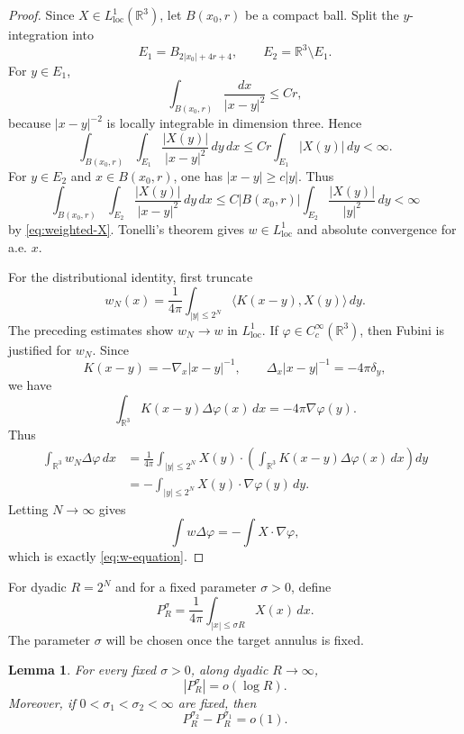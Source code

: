 \documentclass[11pt]{amsart}
\numberwithin{equation}{section}
\newtheorem{lemma}[theorem]{Lemma}
\theoremstyle{definition}
\newcommand{\R}{\mathbb R}
\newcommand{\loc}{\mathrm{loc}}
\newcommand{\ip}[2]{\langle #1,#2\rangle}
\newcommand{\abs}[1]{\left\lvert #1\right\rvert}
\begin{document}
\begin{proof}
Since $X\in L^1_{\loc}(\R^3)$, let $B(x_0,r)$ be a compact ball.  Split the $y$-integration into
$$
        E_1=B_{2\abs{x_0}+4r+4},
        \qquad E_2=\R^3\setminus E_1.
$$
For $y\in E_1$,
$$
        \int_{B(x_0,r)}\frac{dx}{\abs{x-y}^2}\le Cr,
$$
because $\abs{x-y}^{-2}$ is locally integrable in dimension three.  Hence
$$
        \int_{B(x_0,r)}\int_{E_1}\frac{\abs{X(y)}}{\abs{x-y}^2}\,dy\,dx
        \le Cr\int_{E_1}\abs{X(y)}\,dy<\infty.
$$
For $y\in E_2$ and $x\in B(x_0,r)$, one has $\abs{x-y}\ge c\abs y$.  Thus
$$
        \int_{B(x_0,r)}\int_{E_2}\frac{\abs{X(y)}}{\abs{x-y}^2}\,dy\,dx
        \le C\abs{B(x_0,r)}\int_{E_2}\frac{\abs{X(y)}}{\abs y^2}\,dy<\infty
$$
by \eqref{eq:weighted-X}.  Tonelli's theorem gives $w\in L^1_{\loc}$ and absolute convergence for a.e. $x$.

For the distributional identity, first truncate
$$
        w_N(x)=\frac1{4\pi}\int_{\abs y\le 2^N}\ip{K(x-y)}{X(y)}\,dy.
$$
The preceding estimates show $w_N\to w$ in $L^1_{\loc}$.  If $\varphi\in C_c^\infty(\R^3)$, then Fubini is justified for $w_N$.  Since
$$
        K(x-y)=-\nabla_x |x-y|^{-1},
        \qquad \Delta_x |x-y|^{-1}=-4\pi\delta_y,
$$
we have
$$
        \int_{\R^3}K(x-y)\Delta\varphi(x)\,dx=-4\pi\nabla\varphi(y).
$$
Thus
$$
\begin{aligned}
        \int_{\R^3}w_N\Delta\varphi\,dx
        &=\frac1{4\pi}\int_{\abs y\le2^N}X(y)\cdot
          \left(\int_{\R^3}K(x-y)\Delta\varphi(x)\,dx\right)dy       \\
        &=-\int_{\abs y\le2^N}X(y)\cdot\nabla\varphi(y)\,dy.
\end{aligned}
$$
Letting $N\to\infty$ gives
$$
        \int w\Delta\varphi=-\int X\cdot\nabla\varphi,
$$
which is exactly \eqref{eq:w-equation}.
\end{proof}

For dyadic $R=2^N$ and for a fixed parameter $\sigma>0$, define 
\begin{equation}\label{eq:P-R-def}
        P_R^\sigma=\frac1{4\pi}\int_{\abs{x}\le \sigma R}X(x)\,dx.
\end{equation}
The parameter $\sigma$ will be chosen once the target annulus is fixed.  

\begin{lemma}\label{lem:PR-growth}
For every fixed $\sigma>0$, along dyadic $R\to\infty$,
\begin{equation}\label{eq:PR-sublog}
        \abs{P_R^\sigma}=o(\log R).
\end{equation}
Moreover, if $0<\sigma_1<\sigma_2<\infty$ are fixed, then
\begin{equation}\label{eq:change-sigma}
        P_R^{\sigma_2}-P_R^{\sigma_1}=o(1).
\end{equation}
\end{lemma}
\end{document}
